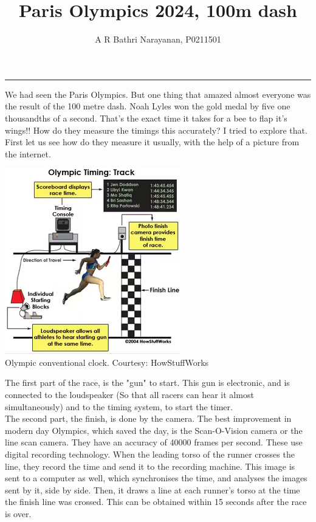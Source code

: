 \documentclass[11pt,a4paper]{article}
\title{Paris Olympics 2024, 100m dash}
\author{A R Bathri Narayanan, P0211501}
\begin{document}
	\maketitle
	\par\noindent\rule{\textwidth}{0.4pt}
	
	We had seen the Paris Olympics. But one thing that amazed almost everyone was the result of the 100 metre dash. Noah Lyles won the gold medal by five one thousandths of a second. That's the exact time it takes for a bee to flap it's wings!!  How do they measure the timings this accurately? I tried to explore that.
	First let us see how do they measure it usually, with the help of a picture from the internet.\\
	\begin{center}
		\includegraphics[width=10 cm]{100m1.png}\\
		Olympic conventional clock. Courtesy: HowStuffWorks
	\end{center}
	
	The  first part of the race, is the "gun" to start. This gun is electronic, and is connected to the loudspeaker (So that all racers can hear it almost simultaneously) and to the timing system, to start the timer.\\
	
	The second part, the finish, is done by the camera. The best improvement in modern day Olympics, which saved the day, is the Scan-O-Vision camera or the line scan camera. They have an accuracy of 40000 frames per second. These use digital recording technology. When the leading torso of the runner crosses the line, they record the time and send it to the recording machine. This image is sent to a computer as well, which synchronises the time, and analyses the images sent by it, side by side. Then, it draws a line at each runner's torso at the time the finish line was crossed. This can be obtained within 15 seconds after the race is over.\\
\end{document}
